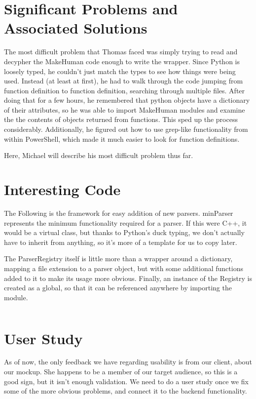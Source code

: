 \documentclass[letterpaper,10pt, onecolumn]{IEEEtran}
\begin{document}
\section*{Significant Problems and Associated Solutions}

The most difficult problem that Thomas faced was simply trying to read and decypher the MakeHuman code enough to write the wrapper. Since Python is loosely typed, he couldn't just match the types to see how things were being used. Instead (at least at first), he had to walk through the code jumping from function definition to function definition, searching through multiple files. After doing that for a few hours, he remembered that python objects have a dictionary of their attributes, so he was able to import MakeHuman modules and examine the the contents of objects returned from functions. This sped up the process considerably. Additionally, he figured out how to use grep-like functionality from within PowerShell, which made it much easier to look for function definitions.

Here, Michael will describe his most difficult problem thus far.

\section*{Interesting Code}

The Following is the framework for easy addition of new parsers. minParser represents the minimum functionality required for a parser. If this were C++, it would be a virtual class, but thanks to Python's duck typing, we don't actually have to inherit from anything, so it's more of a template for us to copy later.

The ParserRegistry itself is little more than a wrapper around a dictionary, mapping a file extension to a parser object, but with some additional functions added to it to make its usage more obvious. Finally, an instance of the Registry is created as a global, so that it can be referenced anywhere by importing the module.

\inputminted{python}{../../code/FaceView/fvParser.py}

\section*{User Study}

As of now, the only feedback we have regarding usability is from our client, about our mockup. She happens to be a member of our target audience, so this is a good sign, but it isn't enough validation. We need to do a user study once we fix some of the more obvious problems, and connect it to the backend functionality.
\end{document}
